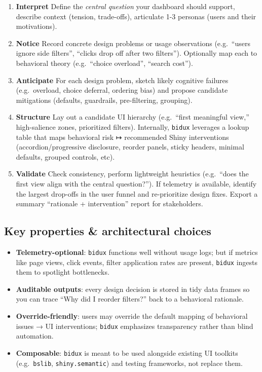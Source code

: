 \documentclass[
  authoryear,
  preprint]{elsarticle}
\providecommand{\tightlist}{%
  \setlength{\itemsep}{0pt}\setlength{\parskip}{0pt}}
\begin{document}
\begin{enumerate}
\def\labelenumi{\arabic{enumi}.}
\item
  \textbf{Interpret} Define the \emph{central question} your dashboard
  should support, describe context (tension, trade-offs), articulate 1-3
  personas (users and their motivations).
\item
  \textbf{Notice} Record concrete design problems or usage observations
  (e.g.~``users ignore side filters'', ``clicks drop off after two
  filters''). Optionally map each to behavioral theory (e.g.~``choice
  overload'', ``search cost'').
\item
  \textbf{Anticipate} For each design problem, sketch likely cognitive
  failures (e.g.~overload, choice deferral, ordering bias) and propose
  candidate mitigations (defaults, guardrails, pre-filtering, grouping).
\item
  \textbf{Structure} Lay out a candidate UI hierarchy (e.g.~``first
  meaningful view,'' high-salience zones, prioritized filters).
  Internally, \texttt{bidux} leverages a lookup table that maps
  behavioral risk ↦ recommended Shiny interventions
  (accordion/progressive disclosure, reorder panels, sticky headers,
  minimal defaults, grouped controls, etc).
\item
  \textbf{Validate} Check consistency, perform lightweight heuristics
  (e.g.~``does the first view align with the central question?''). If
  telemetry is available, identify the largest drop-offs in the user
  funnel and re-prioritize design fixes. Export a summary ``rationale +
  intervention'' report for stakeholders.
\end{enumerate}

\subsection{Key properties \& architectural
choices}\label{key-properties-architectural-choices}

\begin{itemize}
\tightlist
\item
  \textbf{Telemetry-optional}: \texttt{bidux} functions well without
  usage logs; but if metrics like page views, click events, filter
  application rates are present, \texttt{bidux} ingests them to
  spotlight bottlenecks.
\item
  \textbf{Auditable outputs}: every design decision is stored in tidy
  data frames so you can trace ``Why did I reorder filters?'' back to a
  behavioral rationale.
\item
  \textbf{Override-friendly}: users may override the default mapping of
  behavioral issues → UI interventions; \texttt{bidux} emphasizes
  transparency rather than blind automation.
\item
  \textbf{Composable}: \texttt{bidux} is meant to be used alongside
  existing UI toolkits (e.g.~\texttt{bslib}, \texttt{shiny.semantic})
  and testing frameworks, not replace them.
\end{itemize}
\end{document}
